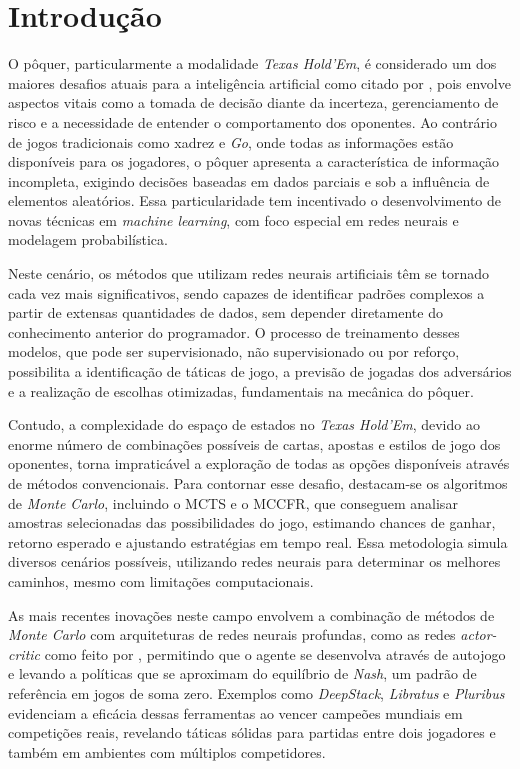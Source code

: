 \chapter{Introdução}
\label{cap:introducao}

O pôquer, particularmente a modalidade \textit{Texas Hold'Em}, é considerado um dos maiores desafios atuais para a inteligência artificial como citado por , pois envolve aspectos vitais como a tomada de decisão diante da incerteza, gerenciamento de risco e a necessidade de entender o comportamento dos oponentes. Ao contrário de jogos tradicionais como xadrez e \textit{Go}, onde todas as informações estão disponíveis para os jogadores, o pôquer apresenta a característica de informação incompleta, exigindo decisões baseadas em dados parciais e sob a influência de elementos aleatórios. Essa particularidade tem incentivado o desenvolvimento de novas técnicas em \textit{machine learning}, com foco especial em redes neurais e modelagem probabilística.

Neste cenário, os métodos que utilizam redes neurais artificiais têm se tornado cada vez mais significativos, sendo capazes de identificar padrões complexos a partir de extensas quantidades de dados, sem depender diretamente do conhecimento anterior do programador. O processo de treinamento desses modelos, que pode ser supervisionado, não supervisionado ou por reforço, possibilita a identificação de táticas de jogo, a previsão de jogadas dos adversários e a realização de escolhas otimizadas, fundamentais na mecânica do pôquer.

Contudo, a complexidade do espaço de estados no \textit{Texas Hold'Em}, devido ao enorme número de combinações possíveis de cartas, apostas e estilos de jogo dos oponentes, torna impraticável a exploração de todas as opções disponíveis através de métodos convencionais. Para contornar esse desafio, destacam-se os algoritmos de \textit{Monte Carlo}, incluindo o \gls{MCTS} e o \gls{MCCFR}, que conseguem analisar amostras selecionadas das possibilidades do jogo, estimando chances de ganhar, retorno esperado e ajustando estratégias em tempo real. Essa metodologia simula diversos cenários possíveis, utilizando redes neurais para determinar os melhores caminhos, mesmo com limitações computacionais.

As mais recentes inovações neste campo envolvem a combinação de métodos de \textit{Monte Carlo} com arquiteturas de redes neurais profundas, como as redes \textit{actor-critic} como feito por , permitindo que o agente se desenvolva através de autojogo e levando a políticas que se aproximam do equilíbrio de \textit{Nash}, um padrão de referência em jogos de soma zero. Exemplos como \textit{DeepStack}, \textit{Libratus} e \textit{Pluribus} evidenciam a eficácia dessas ferramentas ao vencer campeões mundiais em competições reais, revelando táticas sólidas para partidas entre dois jogadores e também em ambientes com múltiplos competidores.

